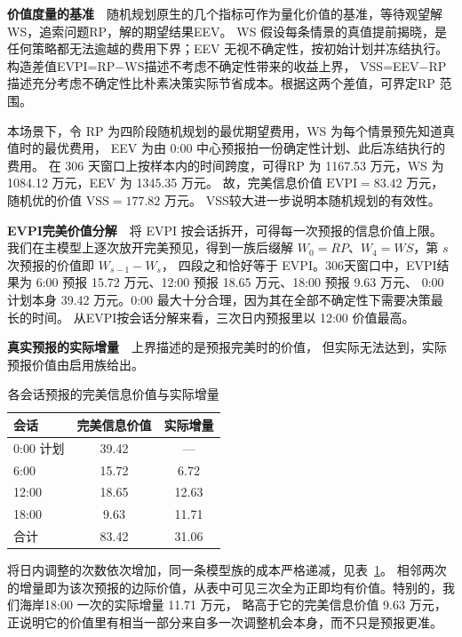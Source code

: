 \documentclass[zihao=-4,a4paper,fontset=none]{ctexart}
\begin{document}
\textbf{价值度量的基准}\ \ 随机规划原生的几个指标可作为量化价值的基准，等待观望解WS，追索问题RP，解的期望结果EEV。
WS 假设每条情景的真值提前揭晓，是任何策略都无法逾越的费用下界；EEV 无视不确定性，按初始计划并冻结执行。
构造差值EVPI=RP−WS描述不考虑不确定性带来的收益上界，
VSS=EEV−RP描述充分考虑不确定性比朴素决策实际节省成本。根据这两个差值，可界定RP 范围。

本场景下，令 RP 为四阶段随机规划的最优期望费用，WS 为每个情景预先知道真值时的最优费用，
EEV 为由 0:00 中心预报拍一份确定性计划、此后冻结执行的费用。
在 306 天窗口上按样本内的时间跨度，可得RP 为 1167.53 万元，WS 为 1084.12 万元，EEV 为 1345.35 万元。
故，完美信息价值 $\mathrm{EVPI}=83.42$ 万元，随机优的价值 $\mathrm{VSS}=177.82$ 万元。
VSS较大进一步说明本随机规划的有效性。

\textbf{EVPI完美价值分解}\ \ 将 EVPI 按会话拆开，可得每一次预报的信息价值上限。
我们在主模型上逐次放开完美预见，得到一族后缀解 $W_0=RP$、$W_4=WS$，第 $s$ 次预报的价值即 $W_{s-1}-W_s$，
四段之和恰好等于 EVPI。306天窗口中，EVPI结果为 6:00 预报 15.72 万元、12:00 预报 18.65 万元、18:00 预报 9.63 万元、
0:00 计划本身 39.42 万元。0:00 最大十分合理，因为其在全部不确定性下需要决策最长的时间。
从EVPI按会话分解来看，三次日内预报里以 12:00 价值最高。


\textbf{真实预报的实际增量}\ \ 上界描述的是预报完美时的价值，
但实际无法达到，实际预报价值由启用族给出。

\begin{table}[htbp]
\centering
\caption{各会话预报的完美信息价值与实际增量}
{\small
\begin{tabular}{lcc}
\toprule
会话 & 完美信息价值 & 实际增量 \\
\midrule
0:00 计划 & 39.42 & --- \\
6:00 & 15.72 & 6.72 \\
12:00 & 18.65 & 12.63 \\
18:00 & 9.63 & 11.71 \\
\midrule
合计 & 83.42 & 31.06 \\
\bottomrule
\end{tabular}}
\label{tab:p3sess}
\end{table}



将日内调整的次数依次增加，同一条模型族的成本严格递减，见表~\ref{tab:p3sess}。
相邻两次的增量即为该次预报的边际价值，从表中可见三次全为正即均有价值。特别的，我们海岸18:00 一次的实际增量 11.71 万元，
略高于它的完美信息价值 9.63 万元，正说明它的价值里有相当一部分来自多一次调整机会本身，而不只是预报更准。
\end{document}
